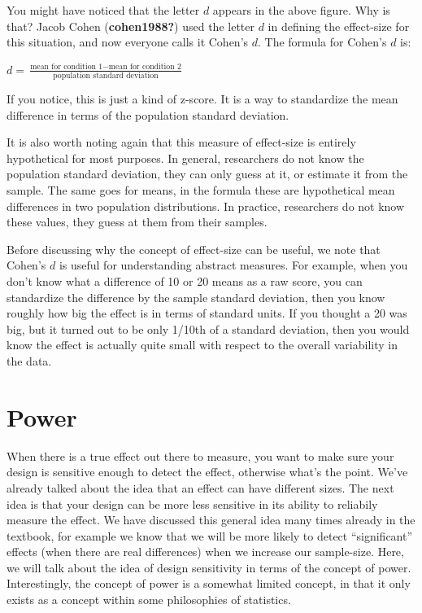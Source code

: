 \documentclass[
  letterpaper,
  DIV=11,
  numbers=noendperiod]{scrreprt}
\begin{document}
You might have noticed that the letter \(d\) appears in the above
figure. Why is that? Jacob Cohen (\textbf{cohen1988?}) used the letter
\(d\) in defining the effect-size for this situation, and now everyone
calls it Cohen's \(d\). The formula for Cohen's \(d\) is:

\(d = \frac{\text{mean for condition 1} - \text{mean for condition 2}}{\text{population standard deviation}}\)

If you notice, this is just a kind of z-score. It is a way to
standardize the mean difference in terms of the population standard
deviation.

It is also worth noting again that this measure of effect-size is
entirely hypothetical for most purposes. In general, researchers do not
know the population standard deviation, they can only guess at it, or
estimate it from the sample. The same goes for means, in the formula
these are hypothetical mean differences in two population distributions.
In practice, researchers do not know these values, they guess at them
from their samples.

Before discussing why the concept of effect-size can be useful, we note
that Cohen's \(d\) is useful for understanding abstract measures. For
example, when you don't know what a difference of 10 or 20 means as a
raw score, you can standardize the difference by the sample standard
deviation, then you know roughly how big the effect is in terms of
standard units. If you thought a 20 was big, but it turned out to be
only 1/10th of a standard deviation, then you would know the effect is
actually quite small with respect to the overall variability in the
data.

\section{Power}\label{power-1}

When there is a true effect out there to measure, you want to make sure
your design is sensitive enough to detect the effect, otherwise what's
the point. We've already talked about the idea that an effect can have
different sizes. The next idea is that your design can be more less
sensitive in its ability to reliabily measure the effect. We have
discussed this general idea many times already in the textbook, for
example we know that we will be more likely to detect ``significant''
effects (when there are real differences) when we increase our
sample-size. Here, we will talk about the idea of design sensitivity in
terms of the concept of power. Interestingly, the concept of power is a
somewhat limited concept, in that it only exists as a concept within
some philosophies of statistics.
\end{document}
